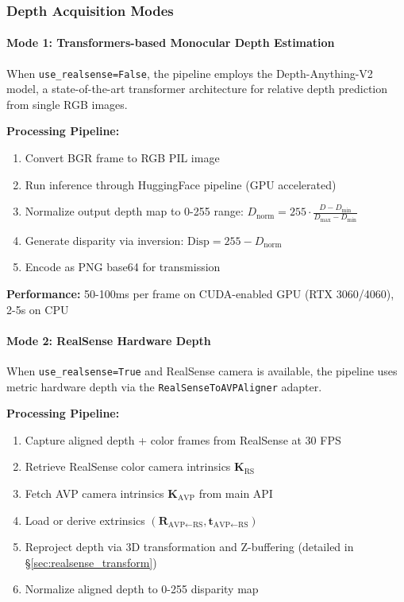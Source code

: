 \subsubsection{Depth Acquisition Modes}

\paragraph{Mode 1: Transformers-based Monocular Depth Estimation}

When \texttt{use\_realsense=False}, the pipeline employs the Depth-Anything-V2 model\cite{depth_anything_v2}, a state-of-the-art transformer architecture for relative depth prediction from single RGB images.

\textbf{Processing Pipeline:}
\begin{enumerate}
    \item Convert BGR frame to RGB PIL image
    \item Run inference through HuggingFace pipeline (GPU accelerated)
    \item Normalize output depth map to 0-255 range: $D_{\text{norm}} = 255 \cdot \frac{D - D_{\min}}{D_{\max} - D_{\min}}$
    \item Generate disparity via inversion: $\text{Disp} = 255 - D_{\text{norm}}$
    \item Encode as PNG base64 for transmission
\end{enumerate}

\textbf{Performance:} 50-100ms per frame on CUDA-enabled GPU (RTX 3060/4060), 2-5s on CPU

\paragraph{Mode 2: RealSense Hardware Depth}

When \texttt{use\_realsense=True} and RealSense camera is available, the pipeline uses metric hardware depth via the \texttt{RealSenseToAVPAligner} adapter.

\textbf{Processing Pipeline:}
\begin{enumerate}
    \item Capture aligned depth + color frames from RealSense at 30 FPS
    \item Retrieve RealSense color camera intrinsics $\mathbf{K}_{\text{RS}}$
    \item Fetch AVP camera intrinsics $\mathbf{K}_{\text{AVP}}$ from main API
    \item Load or derive extrinsics $(\mathbf{R}_{\text{AVP←RS}}, \mathbf{t}_{\text{AVP←RS}})$
    \item Reproject depth via 3D transformation and Z-buffering (detailed in §\ref{sec:realsense_transform})
    \item Normalize aligned depth to 0-255 disparity map
\end{enumerate}

